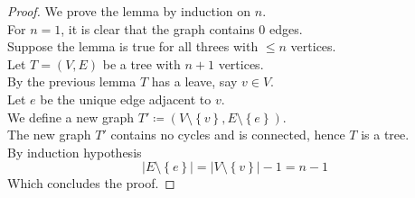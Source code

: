 \documentclass[../main.tex]{subfiles}
\begin{document}
\begin{proof}
We prove the lemma by induction on $n$.\\
For $n=1$, it is clear that the graph contains 0 edges.\\
Suppose the lemma is true for all threes with  $ \leq n$ vertices.\\
Let $T= ( V,E) $ be a tree with $n+1$ vertices.\\
By the previous lemma $T$ has a leave, say $v \in V$.\\
Let $e$ be the unique edge adjacent to $v$.\\
We define a new graph $T' \coloneqq  ( V \setminus \left\{ v \right\} , E \setminus\left\{ e \right\} ) $.\\
The new graph $T'$ contains no cycles and is connected, hence $T$ is a tree.\\
By induction hypothesis 
\[ 
| E \setminus \left\{ e   \right\} | = | V \setminus \left\{ v \right\} | - 1 = n-1
\]
Which concludes the proof.

\end{proof}
\end{document}

